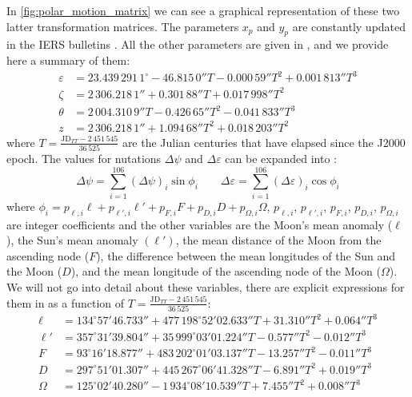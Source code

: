 \documentclass[../main.tex]{subfiles}
\begin{document}
In \cref{fig:polar_motion_matrix} we can see a graphical representation of these two latter transformation matrices. The parameters $x_p$ and $y_p$ are constantly updated in the IERS bulletins \cite{iersbulletinA}. All the other parameters are given in \cite{lieske}, and we provide here a summary of them:
\begin{align}
  \varepsilon & = 23.439\,291\,1^\circ -46.815\,0''T - 0.000\,59''T^2 + 0.001\,813''T^3 \\
  \zeta       & = 2\,306.218\,1''+ 0.301\,88''T + 0.017\,998''T^2                       \\
  \theta      & = 2\,004.310\,9''T- 0.426\,65''T^2 - 0.041\,833''T^3                    \\
  z           & = 2\,306.218\,1'' + 1.094\,68''T^2+0.018\,203''T^2
\end{align}
where $T=\frac{\text{JD}_{TT} - 2\,451\,545}{36\,525}$ are the Julian centuries that have elapsed since the J2000 epoch. The values for nutations $\Delta \psi$ and $\Delta \varepsilon$ can be expanded into \cite{montenbruck}:
\begin{equation}
  \Delta\psi = \sum_{i=1}^{106} {(\Delta\psi)}_i\sin \phi_i\qquad \Delta\varepsilon = \sum_{i=1}^{106} {(\Delta\varepsilon)}_i\cos \phi_i
\end{equation}
where $\phi_i=p_{\ell,i}\ell+ p_{\ell',i}\ell'+p_{F,i}F+p_{D,i}D+p_{\Omega,i}\Omega$, $p_{\ell,i}$, $p_{\ell',i}$, $p_{F,i}$, $p_{D,i}$, $p_{\Omega,i}$ are integer coefficients and the other variables are the Moon's mean anomaly ($\ell$), the Sun's mean anomaly $(\ell')$, the mean distance of the Moon from the ascending node ($F$), the difference between the mean longitudes of the Sun and the Moon ($D$), and the mean longitude of the ascending node of the Moon ($\Omega$). We will not go into detail about these variables, there are explicit expressions for them in \cite{montenbruck} as a function of $T=\frac{\text{JD}_{TT} - 2\,451\,545}{36\,525}$:
\begin{align}
  \ell   & = 134^\circ 57' 46.733'' + 477\,198^\circ 52' 02.633'' T + 31.310'' T^2 + 0.064'' T^3 \\
  \ell'  & = 357^\circ 31' 39.804'' + 35\,999^\circ 03'01.224'' T - 0.577'' T^2 - 0.012'' T^3    \\
  F      & = 93^\circ 16' 18.877'' + 483\,202^\circ 01' 03.137'' T - 13.257'' T^2 - 0.011'' T^3  \\
  D      & = 297^\circ 51' 01.307'' + 445\,267^\circ 06' 41.328'' T - 6.891'' T^2 + 0.019'' T^3  \\
  \Omega & = 125^\circ 02' 40.280'' - 1\,934^\circ 08' 10.539'' T + 7.455'' T^2 + 0.008'' T^3
\end{align}
\end{document}
